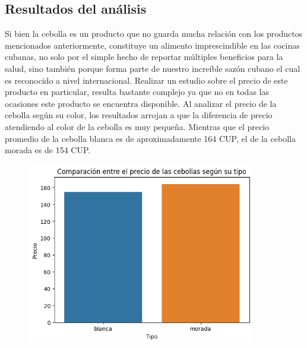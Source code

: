 \documentclass[a4paper,12pt]{article}
\begin{document}
		\subsection{Resultados del análisis}
		Si bien la cebolla es un producto que no guarda mucha relación con los productos mencionados anteriormente, constituye un alimento imprescindible en las cocinas cubanas, no solo por el simple hecho de reportar múltiples beneficios para la salud, sino también porque forma parte de nuestro increíble sazón cubano el cual es reconocido a nivel internacional. Realizar un estudio sobre el precio de este producto en particular, resulta bastante complejo ya que no en todas las ocasiones este producto se encuentra disponible. Al analizar el precio de la cebolla según su color, los resultados arrojan a que la diferencia de precio atendiendo al color de la cebolla es muy pequeña. Mientras que el precio promedio de la cebolla blanca es de aproximadamente 164 CUP, el de la cebolla morada es de 154 CUP.
		
		\begin{figure}[h]
			\centering
			\includegraphics[width=10cm]{onion.png}
			\label{fig:Comparación entre el precio de la cebolla}
		\end{figure}
		
	
	
	\newpage
\end{document}
